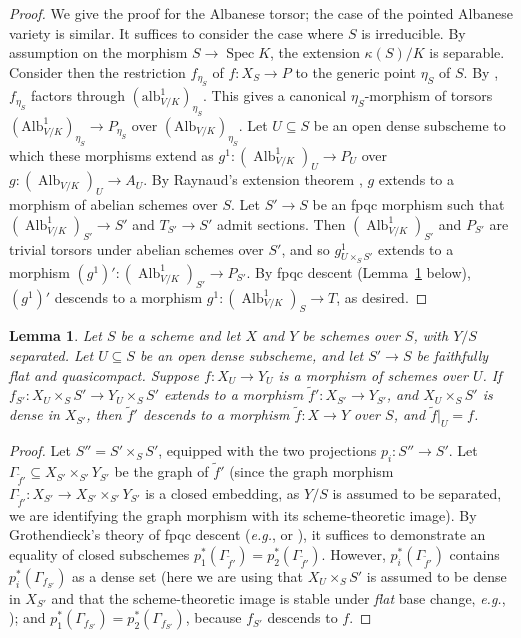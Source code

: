 \documentclass[11pt, reqno]{amsart}
\numberwithin{equation}{section}
\newtheorem{lem}[teo]{Lemma}
\theoremstyle{definition}
\theoremstyle{remark}
\newcommand{\til}[1]{{\widetilde{#1}}}
\DeclareMathOperator{\alb}{Alb}
\begin{document}
 
 \begin{proof}  We give the proof for the Albanese torsor; the case of the pointed Albanese variety is similar.  It suffices to consider the case where $S$ is irreducible.  By assumption on the morphism $S \to \operatorname{Spec} K$, the extension 
  $\kappa(S)/K$ is separable.
  Consider then the restriction $f_{\eta_S}$ of  $f: X_S \to P$ to the generic
  point $\eta_S$ of $S$. By , $f_{\eta_S}$ factors
  through $(\mathrm{alb}^1_{V/K})_{\eta_S}$. This gives a canonical
  $\eta_S$-morphism of torsors $(\mathrm{Alb}^1_{V/K})_{\eta_S} \to P_{\eta_S}$
  over $(\mathrm{Alb}_{V/K})_{\eta_S}$.  Let $U\subseteq S$ be an open dense
  subscheme to which these morphisms extend as $g^1: (\alb^1_{V/K})_U \to P_U$
  over $g: (\alb_{V/K})_U \to A_U$.
  By Raynaud's extension theorem \cite[I.2.7]{FC},
  $g$ extends to a morphism of abelian schemes over $S$.
  Let $S' \to S$ be an fpqc morphism such that $(\alb^1_{V/K})_{S'}\to S'$ and
  $T_{S'}\to S'$ admit sections.  Then $(\alb^1_{V/K})_{S'}$ and $P_{S'}$ are
  trivial torsors under abelian schemes over $S'$, and so $g^1_{U\times_S S'}$
  extends to a morphism $(g^1)': (\alb^1_{V/K})_{S'} \to P_{S'}$.  By fpqc descent
  (Lemma~\ref{L:fpqc} below), $(g^1)'$ descends to a morphism $g^1: (\alb^1_{V/K})_S \to
  T$, as desired.
\end{proof}

\begin{lem}
	  \label{L:fpqc}
	  Let $S$ be a scheme  	   and let $X$ and $Y$ be schemes over  $S$, with $Y/S$ separated. 
	  Let $U\subseteq S$ be an open dense subscheme, and let $S' \to S$ be
	  faithfully flat and quasicompact.  Suppose $f: X_U \to Y_U$ is a morphism of
	  schemes over $U$.  If $f_{S'}: X_U \times_S S' \to Y_U\times_S S'$ extends to a
	  morphism $\til f':X_{S'} \to Y_{S'}$, 
	  and $X_U\times_S S'$ is dense in $X_{S'}$,  
     	  then $\til f'$ descends to a morphism
	  $\til f: X \to Y$ over $S$, and $\til f|_U = f$.	
	   	\end{lem}
          
	 \begin{proof}
	  Let $S'' = S' \times_S S'$, equipped with the two projections $p_i:S'' \to
	  S'$. Let $\Gamma_{\til f'} \subseteq X_{S'} \times_{S'} Y_{S'}$ be the graph of
	  $\til f'$ (since the graph morphism $\Gamma_{\til f'}:X_{S'}\to   X_{S'} \times_{S'} Y_{S'}$  is a closed embedding, as $Y/S$ is assumed to be separated, we are identifying the graph morphism with its scheme-theoretic image).  By Grothendieck's theory of fpqc descent (\emph{e.g.}, \cite[\S
	  6.1]{BLR} or \cite[Thm.~3.1]{conradtrace}), it suffices to demonstrate an
	  equality of closed subschemes $p_1^*(\Gamma_{\til f'}) = p_2^*(\Gamma_{\til
	   f'})$. However, $p_i^*(\Gamma_{\til f'})$ contains $p_i^*(\Gamma_{f_{S'}})$ as a
	  dense set (here we are using that $X_U\times_SS'$ is assumed to be dense in $X_{S'}$  and that the scheme-theoretic image is stable under \emph{flat} base change, \emph{e.g.}, \cite[Prop.~V-8, p.217]{EH2000}); and $p_1^*(\Gamma_{f_{S'}}) = p_2^*(\Gamma_{f_{S'}})$, because
	  $f_{S'}$ descends to $f$.
	 \end{proof}
\end{document}
